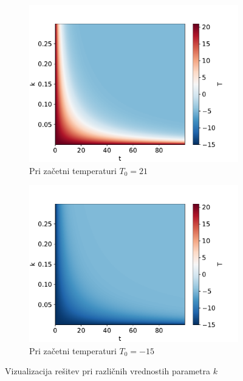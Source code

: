 \documentclass{article}
\begin{document}
\begin{figure}[H]
    \centering
    \begin{subfigure}{0.49\textwidth}
        \centering
        \includegraphics[width=\linewidth]{family21.00.pdf}
		\caption{Pri začetni temperaturi $T_0=21$}
        \label{fig:image1}
    \end{subfigure}
    \hfill
    \begin{subfigure}{0.49\textwidth}
        \centering
		\includegraphics[width=\linewidth]{family-15.00.pdf}
		\caption{Pri začetni temperaturi $T_0=-15$}
        \label{fig:image2}
    \end{subfigure}
	\caption{Vizualizacija rešitev pri različnih vrednostih parametra $k$}
\end{figure}
\end{document}
